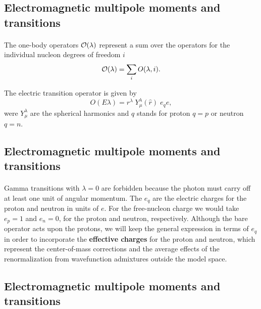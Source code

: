 \documentclass[%
twoside,                 %
final,                   %
10pt]{article}
\begin{document}
\subsection*{Electromagnetic multipole moments and transitions}

\paragraph{}
The one-body operators $  {\cal O}(\lambda )  $ represent a sum over
the operators for the individual nucleon degrees of freedom  $  i  $
\[
{\cal O}(\lambda ) = \sum_{i} O(\lambda ,i). 
\]

The electric transition operator is given by
\[
O(E\lambda ) = r^{\lambda } \; Y^{\lambda }_{\mu }(\hat{r}) \; e_{q} e, 
\]
were $Y^{\lambda }_{\mu }$ are the spherical harmonics
and $q$ stands for proton $q=p$ or neutron $q=n$.




\subsection*{Electromagnetic multipole moments and transitions}

\paragraph{}
Gamma transitions
with $\lambda=0$ are forbidden because the photon must carry off
at least one unit of angular momentum. The $e_{q}$
are the electric charges for the proton and neutron in units of $  e  $.
For the free-nucleon
charge we would take $e_{p}=1$ and $e_{n}=0$, for the
proton and neutron, respectively.
Although the bare operator acts upon the protons,
we will keep the general expression in terms of $e_{q}$ in order
to incorporate the \textbf{effective charges} for the proton and
neutron, which represent the center-of-mass corrections and the
average effects of the renormalization from wavefunction
admixtures outside the model space.



\subsection*{Electromagnetic multipole moments and transitions}

\end{document}
